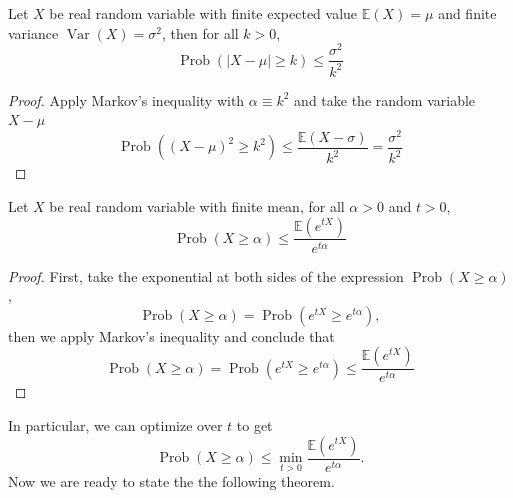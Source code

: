 \begin{lemma}
Let $X$ be real random variable with finite expected value $\mathbb{E}(X)=\mu$ and finite variance $\operatorname{Var}(X) = \sigma^2$, then for all $k >0$,
\begin{equation}
\operatorname{Prob}(|X-\mu|\geq k)\leq \frac{\sigma^2}{k^2}
\end{equation}
\end{lemma}

\begin{proof}
Apply Markov's inequality with $\alpha \equiv k^2$ and take the random variable $X-\mu$
\begin{equation}
\operatorname{Prob}\left((X-\mu)^2\geq k^2\right)\leq \frac{\mathbb{E}(X-\sigma)}{k^2} = \frac{\sigma^2}{k^2}
\end{equation}
\end{proof}

\begin{lemma}
Let $X$ be real random variable with finite mean, for all $\alpha>0$ and $t>0$,
\begin{equation}
\operatorname{Prob}(X\geq \alpha)\leq \frac{\mathbb{E}(e^{t X})}{e^{t\alpha }}
\label{CH2_chernoff_bound}
\end{equation}
\end{lemma}
\begin{proof}
First, take the exponential at both sides of the expression $\operatorname{Prob}(X\geq \alpha)$,
\begin{equation}
\operatorname{Prob}(X\geq \alpha) = \operatorname{Prob}(e^{tX}\geq e^{t\alpha}),
\label{CH2:proof_chernoff_bound}
\end{equation}
then we apply Markov's inequality and conclude that
\begin{equation}
\operatorname{Prob}(X\geq \alpha)= \operatorname{Prob}(e^{tX}\geq e^{t\alpha})\leq \frac{\mathbb{E}(e^{t X})}{e^{t\alpha }}
\end{equation}
\end{proof}
In particular, we can optimize over $t$ to get
 \begin{equation}
\operatorname{Prob}(X\geq \alpha)\leq \min_{t>0} \frac{\mathbb{E}(e^{t X})}{e^{t\alpha }}.
\label{CH2:optimal_chernoff_bound}
\end{equation}
Now we are ready to state the the following theorem\cite{barg_random_2002}.

